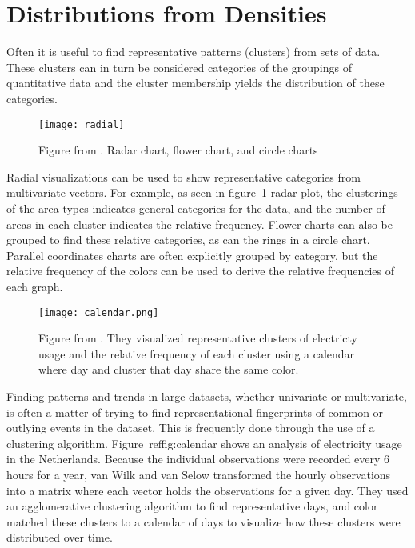 \section{Distributions from Densities}  

Often it is useful to find representative patterns (clusters) from sets of data. These clusters can in turn be considered categories of the groupings of quantitative data and the cluster membership yields the distribution of these categories. 

\begin{figure}
\texttt{[image: radial]}
\caption{Figure from \cite{Albo_Bak_}. Radar chart, flower chart, and circle
  charts}
\label{fig:radial}
\end{figure}
Radial visualizations can be used to show representative
categories from multivariate vectors. For example, as seen in figure~\ref{fig:radial}
radar plot, the clusterings of the area types indicates general categories for
the data, and the number of areas in each cluster indicates the relative
frequency. Flower charts can also be grouped to find these relative
categories, as can the rings in a circle chart. Parallel coordinates charts are often explicitly grouped by category, but the relative frequency of the colors can be used to derive the relative frequencies of each graph. 

\begin{figure}
\texttt{[image: calendar.png]}
\caption{Figure from \cite{van_wijk_van_selow}. They visualized representative clusters of electricty usage and the relative frequency of each cluster using a calendar where day and cluster that day share the same color.}
\label{fig:calendar}
\end{figure}

Finding patterns and trends in large datasets, whether univariate or multivariate, is often a matter of trying to find representational fingerprints of common or outlying events in the dataset. This is frequently done through the use of a clustering algorithm. Figure~ref{fig:calendar} shows an analysis of electricity usage in the Netherlands\cite{van_wijk_van_selow}. Because the individual observations were recorded every 6 hours for a year, van Wilk and van Selow transformed the hourly observations into a matrix where each vector holds the observations for a given day. They used an agglomerative clustering algorithm \cite{kaufman_rousseeuw} to find representative days, and color matched these clusters to a calendar of days to visualize how these clusters were distributed over time. 
